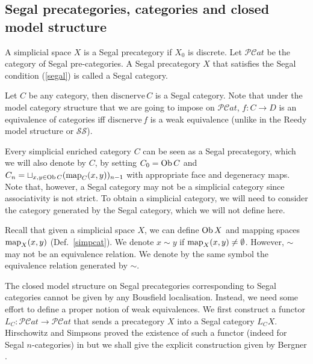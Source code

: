 \begin{refsection}
\subsection{Segal precategories, categories and closed model structure}
\begin{defin}
A simplicial space $X$ is a Segal precategory if $X_0$ is discrete. Let $\mathcal{PC}at$ be the category of Segal pre-categories. A Segal precategory $X$ that satisfies the Segal condition (\ref{segal}) is called a Segal category.
\end{defin}

\begin{eg}
Let $C$ be any category, then $\mathrm{discnerve}\,C$ is a Segal category. Note that under the model category structure that we are going to impose on $\mathcal{PC}at$, $f:C\to D$ is an equivalence of categories iff $\mathrm{discnerve}\,f$ is a weak equivalence (unlike in the Reedy model structure or $\mathcal{SS}$).
\end{eg}

Every simplicial enriched category $C$ can be seen as a Segal precategory, which we will also denote by $C$, by setting $C_0=\operatorname{Ob} C$ and $C_n=\sqcup_{x,y\in\operatorname{Ob} C}(\operatorname{\mathrm{map}}_C(x,y))_{n-1}$ with appropriate face and degeneracy maps. Note that, however, a Segal category may not be a simplicial category since associativity is not strict. To obtain a simplicial category, we will need to consider the category generated by the Segal category, which we will not define here.

Recall that given a simplicial space $X$, we can define $\operatorname{Ob} X$ and mapping spaces $\operatorname{\mathrm{map}}_X(x,y)$ (Def.~\ref{simpcat}). We denote $x\sim y$ if $\operatorname{\mathrm{map}}_X(x,y)\ne\emptyset$. However, $\sim$ may not be an equivalence relation. We denote by the same symbol the equivalence relation generated by $\sim$.

The closed model structure on Segal precategories corresponding to Segal categories cannot be given by any Bousfield localisation. Instead, we need some effort to define a proper notion of weak equivalences. We first construct a functor $L_C:\mathcal{PC}at\to\mathcal{PC}at$ that sends a precategory $X$ into a Segal category $L_CX$. Hirschowitz and Simpsons proved the existence of such a functor (indeed for Segal $n$-categories) in \cite{hs} but we shall give the explicit construction given by Bergner \cite{bergner2}.


\end{refsection}

